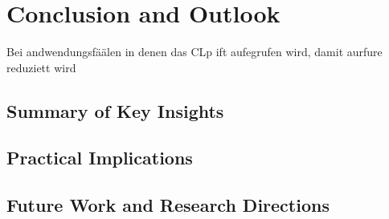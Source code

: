\chapter{Conclusion and Outlook}
\label{sec:conclusion}
Bei andwendungsfäälen in denen das CLp ift aufegrufen wird, damit aurfure reduziett wird
\section{Summary of Key Insights}
\section{Practical Implications}
\section{Future Work and Research Directions}
